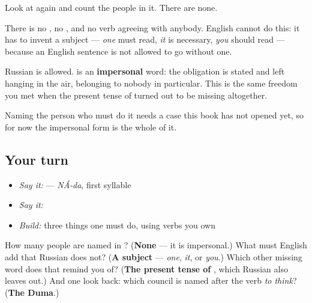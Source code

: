 \begin{grammarlens}[title={Grammar lens — the sentence with no subject}]
Look at \textbf{ } again and count the people in it. There are none.

There is no \textbf{}, no \textbf{}, and no verb agreeing with anybody. English cannot do this: it has to invent a subject — \emph{one} must read, \emph{it} is necessary, \emph{you} should read — because an English sentence is not allowed to go without one.

Russian is allowed. \textbf{} is an \textbf{impersonal} word: the obligation is stated and left hanging in the air, belonging to nobody in particular. This is the same freedom you met when the present tense of \textbf{} turned out to be missing altogether.

Naming the person who must do it needs a case this book has not opened yet, so for now the impersonal form is the whole of it.
\end{grammarlens}

\subsection*{Your turn}
\begin{itemize}
\raggedright
  \item \emph{Say it:} \emph{ } — \emph{NÁ-da}, first syllable
  \item \emph{Say it:} \emph{ }
  \item \emph{Build:} three things one must do, using verbs you own
\end{itemize}

\begin{tcolorbox}[breakable,colback=teal!4,colframe=teal!35!black,title={Before you move on}]
How many people are named in \emph{ }? (\textbf{None} — it is impersonal.) What must English add that Russian does not? (\textbf{A subject} — \emph{one}, \emph{it}, or \emph{you}.) Which other missing word does that remind you of? (\textbf{The present tense of }, which Russian also leaves out.) And one look back: which council is named after the verb \emph{to think}? (\textbf{The Duma}.)
\end{tcolorbox}
